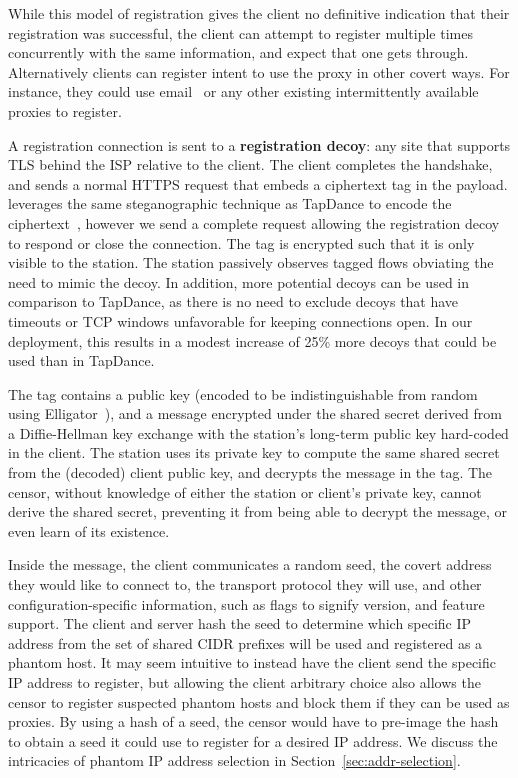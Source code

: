 \documentclass[sigconf]{acmart}
\begin{document}
While this model of registration gives the client no definitive indication that their 
registration was successful, the client can attempt to register
multiple times concurrently with the same information, 
and expect that one gets through. Alternatively clients can register intent to use the 
proxy in other covert ways. For instance, they could use email~\cite{SWEET-ToN} or any 
other existing intermittently available proxies to register.

A registration connection is sent to a \textbf{registration decoy}: any site that 
supports TLS behind the ISP relative to the client. The client completes the handshake,
and sends a normal HTTPS request that embeds a ciphertext tag in the payload. 
\scheme leverages the same steganographic technique as TapDance to encode the 
ciphertext~\cite[\S3]{tapdance14}, however we send a complete request allowing the
registration decoy to respond or close the connection. The tag is encrypted such 
that it is only visible to the station. The \scheme station passively observes
tagged flows obviating the need to mimic the decoy. In addition, more potential 
decoys can be used in comparison to TapDance, as there is no need to exclude decoys that 
have timeouts or TCP windows unfavorable for keeping connections open. In our 
deployment, this results in a modest increase of 25\% more decoys that could be 
used than in TapDance.


The tag contains a public key (encoded to be indistinguishable from random using
Elligator~\cite{elligator}), and a message encrypted under the shared secret
derived from a Diffie-Hellman key exchange with the station's long-term public key hard-coded
in the client. The station uses its private key to compute the same
shared secret from the (decoded) client public key, and decrypts the message in the
tag. The censor, without knowledge of either the station or client's private
key, cannot derive the shared secret, preventing it from being able to decrypt
the message, or even learn of its existence.


Inside the message, the client communicates a random seed, the covert address 
they would like to connect to, the transport protocol they will use, and other
configuration-specific information, such as flags to signify version, and feature support.
The client and server hash the seed to determine which specific
IP address from the set of shared CIDR prefixes will be used and registered as a phantom host.
It may seem intuitive to instead have the client
send the specific IP address to register, but allowing the client arbitrary
choice also allows the censor to register suspected phantom hosts and block them if
they can be used as proxies.
By using a hash of a seed, the censor would have to pre-image the hash to
obtain a seed it could use to register for a desired IP address.
We discuss the intricacies of phantom IP address selection in
Section~\ref{sec:addr-selection}.
\end{document}
